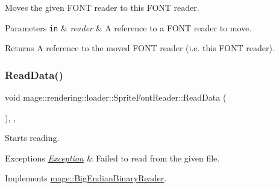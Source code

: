 Moves the given F\+O\+NT reader to this F\+O\+NT reader.


\begin{DoxyParams}[1]{Parameters}
\mbox{\tt in}  & {\em reader} & A reference to a F\+O\+NT reader to move. \\
\hline
\end{DoxyParams}
\begin{DoxyReturn}{Returns}
A reference to the moved F\+O\+NT reader (i.\+e. this F\+O\+NT reader). 
\end{DoxyReturn}
\mbox{\label{classmage_1_1rendering_1_1loader_1_1_sprite_font_reader_ae5b827dade3bd800e2000788efa91e30}} 
\subsubsection{\texorpdfstring{Read\+Data()}{ReadData()}}
{\footnotesize\ttfamily void mage\+::rendering\+::loader\+::\+Sprite\+Font\+Reader\+::\+Read\+Data (\begin{DoxyParamCaption}{ }\end{DoxyParamCaption})\hspace{0.3cm}{\ttfamily [override]}, {\ttfamily [private]}, {\ttfamily [virtual]}}

Starts reading.


\begin{DoxyExceptions}{Exceptions}
{\em \mbox{\hyperlink{classmage_1_1_exception}{Exception}}} & Failed to read from the given file. \\
\hline
\end{DoxyExceptions}


Implements \mbox{\hyperlink{classmage_1_1_big_endian_binary_reader_a7dc0689d598fa91308597b129516a11d}{mage\+::\+Big\+Endian\+Binary\+Reader}}.

\mbox{\label{classmage_1_1rendering_1_1loader_1_1_sprite_font_reader_a0308b90e3cf888d383a228cfe8827972}} 
